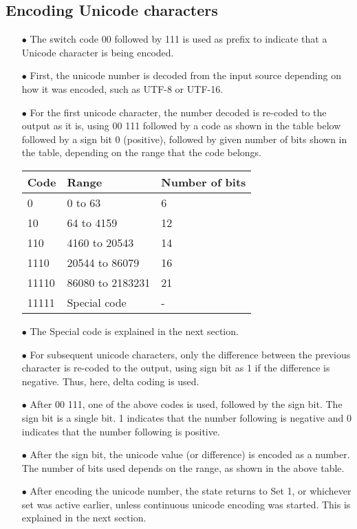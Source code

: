 \documentclass[]{article}
\begin{document}
\subsection{Encoding Unicode characters}
\begin{itemize}
	\item[$\bullet$] The switch code 00 followed by 111 is used as prefix to indicate that a Unicode character is being encoded.
	\item[$\bullet$] First, the unicode number is decoded from the input source depending on how it was encoded, such as UTF-8 or UTF-16.
	\item[$\bullet$] For the first unicode character, the number decoded is re-coded to the output as it is, using 00 111 followed by a code as shown in the table below followed by a sign bit 0 (positive), followed by given number of bits shown in the table, depending on the range that the code belongs.
	\item[] \begin{tabular}{ | l | l | l |} \hline
		\textbf{Code} & \textbf{Range} & \textbf{Number of bits} \\ \hline
		0 & 0 to 63 & 6 \\ \hline
		10 & 64 to 4159 & 12 \\ \hline
		110 & 4160 to 20543 & 14 \\ \hline
		1110 & 20544 to 86079 & 16 \\ \hline
		11110 & 86080 to 2183231 & 21 \\ \hline
		11111 & Special code & - \\ \hline
		\end{tabular}
	\item[$\bullet$] The Special code is explained in the next section.
	\item[$\bullet$] For subsequent unicode characters, only the difference between the previous character is re-coded to the output, using sign bit as 1 if the difference is negative. Thus, here, delta coding is used.
	\item[$\bullet$] After 00 111, one of the above codes is used, followed by the sign bit. The sign bit is a single bit. 1 indicates that the number following is negative and 0 indicates that the number following is positive.
	\item[$\bullet$] After the sign bit, the unicode value (or difference) is encoded as a number. The number of bits used depends on the range, as shown in the above table.
	\item[$\bullet$] After encoding the unicode number, the state returns to Set 1, or whichever set was active earlier, unless continuous unicode encoding was started. This is explained in the next section.
\end{itemize}
\end{document}
